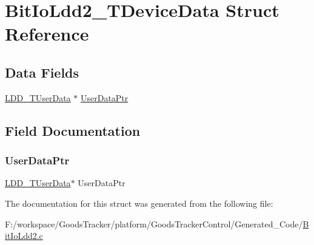 \hypertarget{struct_bit_io_ldd2___t_device_data}{}\section{Bit\+Io\+Ldd2\+\_\+\+T\+Device\+Data Struct Reference}
\label{struct_bit_io_ldd2___t_device_data}
\subsection*{Data Fields}
\begin{DoxyCompactItemize}
\item 
\hyperlink{group___p_e___types__module_ga0b66a73f87238a782318aa0be7578e35}{L\+D\+D\+\_\+\+T\+User\+Data} $\ast$ \hyperlink{struct_bit_io_ldd2___t_device_data_a8e77b9d030b00c231823350a904e0f83}{User\+Data\+Ptr}
\end{DoxyCompactItemize}


\subsection{Field Documentation}
\mbox{\label{struct_bit_io_ldd2___t_device_data_a8e77b9d030b00c231823350a904e0f83}} 
\subsubsection{\texorpdfstring{User\+Data\+Ptr}{UserDataPtr}}
{\footnotesize\ttfamily \hyperlink{group___p_e___types__module_ga0b66a73f87238a782318aa0be7578e35}{L\+D\+D\+\_\+\+T\+User\+Data}$\ast$ User\+Data\+Ptr}



The documentation for this struct was generated from the following file\+:\begin{DoxyCompactItemize}
\item 
F\+:/workspace/\+Goods\+Tracker/platform/\+Goods\+Tracker\+Control/\+Generated\+\_\+\+Code/\hyperlink{_bit_io_ldd2_8c}{Bit\+Io\+Ldd2.\+c}\end{DoxyCompactItemize}
